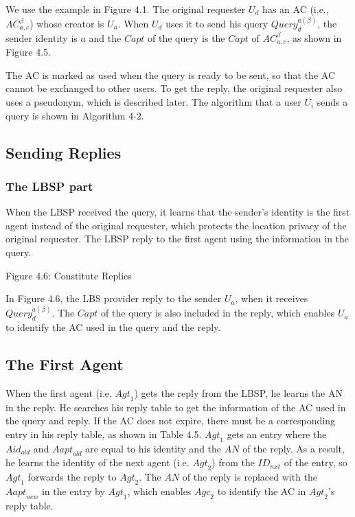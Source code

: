 We use the example in Figure 4.1. The original requester $U_d$ has an AC (i.e., ${AC}^{\beta }_{a,c}$) whose creator is $U_a$. When $U_d$ uses it to send his query ${Query}^{a\left(\beta\right)}_d$, the sender identity is $a$ and the $Capt$ of the query is the $Capt$ of ${AC}^{\beta }_{a,c}$, as shown in Figure 4.5.

The AC is marked as used when the query is ready to be sent, so that the AC cannot be exchanged to other users. To get the reply, the original requester also uses a pseudonym, which is described later. The algorithm that a user $U_i$ sends a query is shown in Algorithm 4-2.


\subsection{ Sending Replies}


\subsubsection{ The LBSP part}

\noindent When the LBSP received the query, it learns that the sender's identity is the first agent instead of the original requester, which protects the location privacy of the original requester. The LBSP reply to the first agent using the information in the query.

Figure 4.6: Constitute Replies

\noindent In Figure 4.6, the LBS provider reply to the sender $U_a$, when it receives ${Query}^{a\left(\beta\right)}_d$. The $Capt$ of the query is also included in the reply, which enables $U_a$ to identify the AC used in the query and the reply.


\subsection{ The First Agent}

\noindent When the first agent (i.e. ${Agt}_1$) gets the reply from the LBSP, he learns the $\mathrm{AN}$ in the reply. He searches his reply table to get the information of the AC used in the query and reply. If the AC does not expire, there must be a corresponding entry in his reply table, as shown in Table 4.5. ${Agt}_1$ gets an entry where the $Aid_{old}$ and ${Aapt}_{old}$ are equal to his identity and the $AN$ of the reply. As a result, he learns the identity of the next agent (i.e. ${Agt}_2$) from the ${ID}_{nxt}$ of the entry, so ${Agt}_1$ forwards the reply to ${Agt}_2$. The $AN$ of the reply is replaced with the ${Aapt}_{new}$ in the entry by ${Agt}_1$, which enables ${Agc}_2$ to identify the AC in ${Agt}_2$'s reply table.

